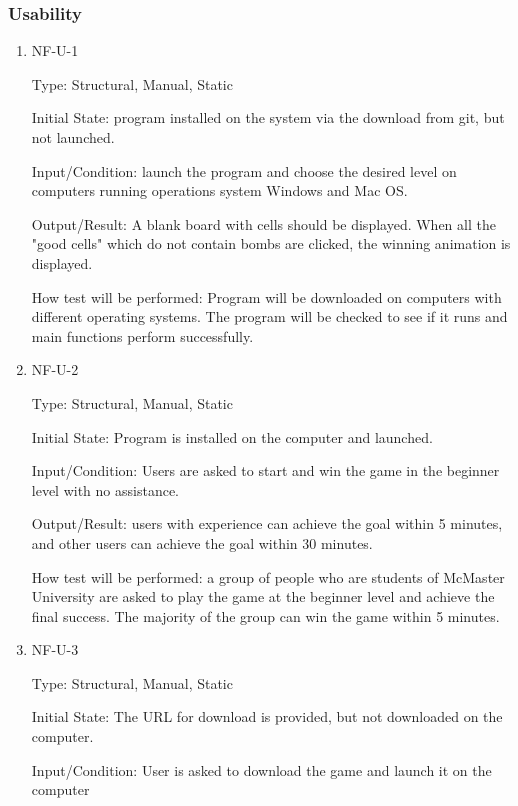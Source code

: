 \documentclass[12pt, titlepage]{article}
\begin{document}
\subsubsection{Usability}

\begin{enumerate}

\item{NF-U-1\\}

Type: Structural, Manual, Static

Initial State: program installed on the system via the download from git, but not launched.

Input/Condition: launch the program and choose the desired level on computers running operations system Windows and Mac OS.

Output/Result: A blank board with cells should be displayed. When all the "good cells" which do not contain bombs are clicked, the winning animation is displayed.

How test will be performed: Program will be downloaded on computers with different operating systems. The program will be checked to see if it runs and main functions perform successfully.

\item{NF-U-2\\}

Type: Structural, Manual, Static
					
Initial State: Program is installed on the computer and launched. 

Input/Condition: Users are asked to start and win the game in the beginner level with no assistance.
					
Output/Result: users with experience can achieve the goal within 5 minutes, and other users can achieve the goal within 30 minutes.
					
How test will be performed: a group of people who are students of McMaster University are asked to play the game at the beginner level and achieve the final success. The majority of the group can win the game within 5 minutes. 

\item{NF-U-3\\}

Type: Structural, Manual, Static
					
Initial State: The URL for download is provided, but not downloaded on the computer.

Input/Condition: User is asked to download the game and launch it on the computer
					

\end{enumerate}
\end{document}
